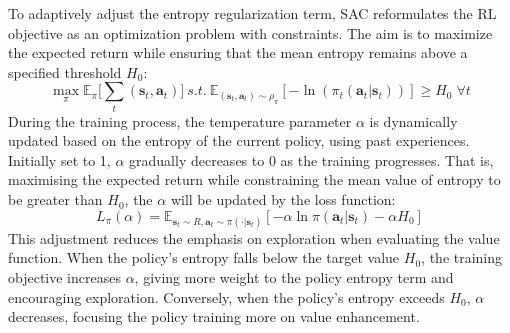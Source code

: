 To adaptively adjust the entropy regularization term, SAC reformulates the RL objective as an optimization problem with constraints. The aim is to maximize the expected return while ensuring that the mean entropy remains above a specified threshold $H_0$: $$\max_\pi\mathbb{E}_\pi \bigg[\sum_t (\mathbf{s}_t, \mathbf{a}_t)\bigg]\:s.t.\:\mathbb{E}_{(\mathbf{s}_t, \mathbf{a}_t)\sim\rho_\pi}[-\ln (\pi_t(\mathbf{a}_t|\mathbf{s}_t))] \geq H_0\;\forall t$$ During the training process, the temperature parameter $\alpha$ is dynamically updated based on the entropy of the current policy, using past experiences. Initially set to 1, $\alpha$ gradually decreases to 0 as the training progresses. That is, maximising the expected return while constraining the mean value of entropy to be greater than $H_0$, the $\alpha$ will be updated by the loss function: $$L_\pi(\alpha) = \mathbb{E}_{\mathbf{s}_t\sim R, \mathbf{a}_t\sim\pi(\cdot|\mathbf{s}_t)} [-\alpha\ln\pi(\mathbf{a}_t|\mathbf{s}_t)-\alpha H_0]$$ This adjustment reduces the emphasis on exploration when evaluating the value function. When the policy's entropy falls below the target value $H_0$, the training objective increases $\alpha$, giving more weight to the policy entropy term and encouraging exploration. Conversely, when the policy's entropy exceeds $H_0$, $\alpha$ decreases, focusing the policy training more on value enhancement. 


